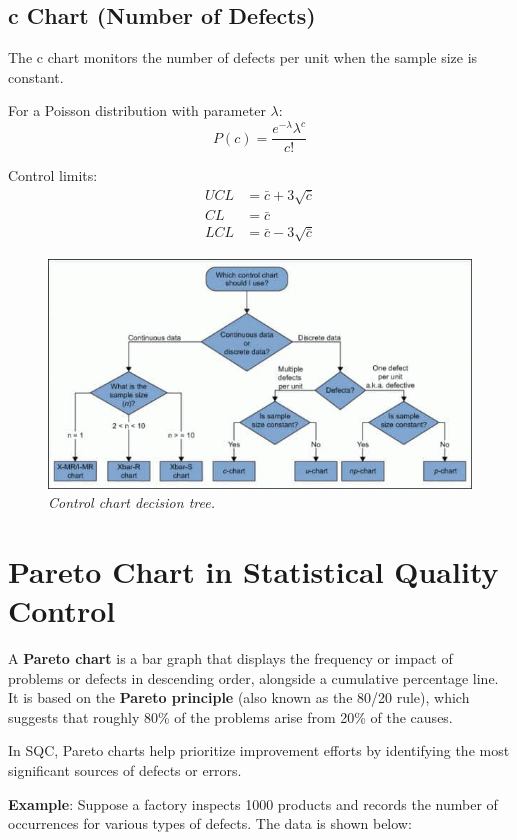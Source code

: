 \documentclass[twoside]{book}
\begin{document}
\subsection{c Chart (Number of Defects)}

The c chart monitors the number of defects per unit when the sample size is constant.

For a Poisson distribution with parameter $\lambda$:
$$P(c) = \frac{e^{-\lambda}\lambda^c}{c!}$$

Control limits:
\begin{align}
UCL &= \bar{c} + 3\sqrt{\bar{c}}\\
CL &= \bar{c}\\
LCL &= \bar{c} - 3\sqrt{\bar{c}}
\end{align}

\begin{figure}
\centering
\includegraphics[scale=0.6]{pic/control-chart-decision-tree.jpg}
\caption{\textit{Control chart decision tree.}}
\end{figure}

\section{Pareto Chart in Statistical Quality Control}

A \textbf{Pareto chart} is a bar graph that displays the frequency or impact of problems or defects in descending order, alongside a cumulative percentage line. It is based on the \textbf{Pareto principle} (also known as the 80/20 rule), which suggests that roughly 80\% of the problems arise from 20\% of the causes.

In SQC, Pareto charts help prioritize improvement efforts by identifying the most significant sources of defects or errors.

\textbf{Example}: Suppose a factory inspects 1000 products and records the number of occurrences for various types of defects. The data is shown below:
\end{document}
